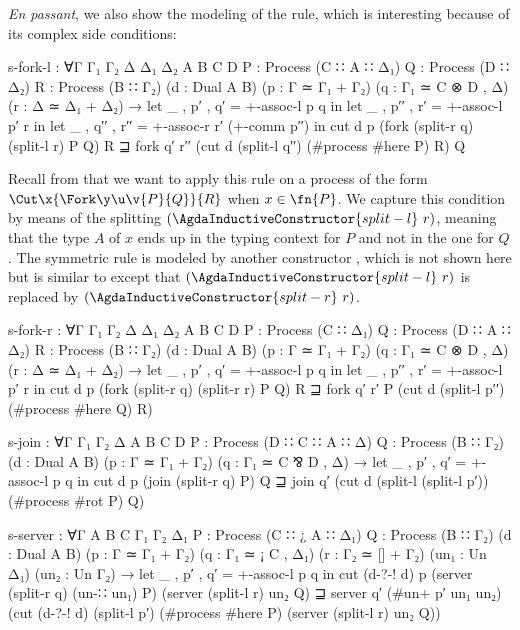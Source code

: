 \begin{AgdaAlign}
\emph{En passant}, we also show the modeling of the \SForkL rule, which is
interesting because of its complex side conditions:

\begin{code}
  s-fork-l :
    ∀{Γ Γ₁ Γ₂ Δ Δ₁ Δ₂ A B C D}
    {P : Process (C ∷ A ∷ Δ₁)} {Q : Process (D ∷ Δ₂)} {R : Process (B ∷ Γ₂)}
    (d : Dual A B) (p : Γ ≃ Γ₁ + Γ₂) (q : Γ₁ ≃ C ⊗ D , Δ) (r : Δ ≃ Δ₁ + Δ₂) →
    let _ , p′ , q′ = +-assoc-l p q in
    let _ , p′′ , r′ = +-assoc-l p′ r in
    let _ , q′′ , r′′ = +-assoc-r r′ (+-comm p′′) in
    cut d p (fork (split-r q) (split-l r) P Q) R ⊒
    fork q′ r′′ (cut d (split-l q′′) (#process #here P) R) Q
\end{code}

Recall from  that we want to apply this rule on a process of
the form $\Cut\x{\Fork\y\u\v{P}{Q}}{R}$ when $x \in \fn{P}$. We capture this
condition by means of the splitting $(\AgdaInductiveConstructor{split-l}~r)$,
meaning that the type $A$ of $x$ ends up in the typing context for $P$ and not
in the one for $Q$.
%
The symmetric rule \SForkR is modeled by another constructor
, which is not shown here but is similar to
 except that
$(\AgdaInductiveConstructor{split-l}~r)$ is replaced by
$(\AgdaInductiveConstructor{split-r}~r)$.

\begin{code}[hide]
  s-fork-r :
    ∀{Γ Γ₁ Γ₂ Δ Δ₁ Δ₂ A B C D}
    {P : Process (C ∷ Δ₁)}
    {Q : Process (D ∷ A ∷ Δ₂)}
    {R : Process (B ∷ Γ₂)}
    (d : Dual A B) (p : Γ ≃ Γ₁ + Γ₂) (q : Γ₁ ≃ C ⊗ D , Δ)
    (r : Δ ≃ Δ₁ + Δ₂) →
    let _ , p′ , q′ = +-assoc-l p q in
    let _ , p′′ , r′ = +-assoc-l p′ r in
    cut d p (fork (split-r q) (split-r r) P Q) R ⊒
    fork q′ r′ P (cut d (split-l p′′) (#process #here Q) R)

  s-join :
    ∀{Γ Γ₁ Γ₂ Δ A B C D}
    {P : Process (D ∷ C ∷ A ∷ Δ)}
    {Q : Process (B ∷ Γ₂)}
    (d : Dual A B) (p : Γ ≃ Γ₁ + Γ₂) (q : Γ₁ ≃ C ⅋ D , Δ) →
    let _ , p′ , q′ = +-assoc-l p q in
    cut d p (join (split-r q) P) Q ⊒
    join q′ (cut d (split-l (split-l p′)) (#process #rot P) Q)

  s-server :
    ∀{Γ A B C Γ₁ Γ₂ Δ₁}
    {P : Process (C ∷ ¿ A ∷ Δ₁)}
    {Q : Process (B ∷ Γ₂)}
    (d : Dual A B) (p : Γ ≃ Γ₁ + Γ₂) (q : Γ₁ ≃ ¡ C , Δ₁) (r : Γ₂ ≃ [] + Γ₂)
    (un₁ : Un Δ₁) (un₂ : Un Γ₂) →
    let _ , p′ , q′ = +-assoc-l p q in
    cut (d-?-! d) p (server (split-r q) (un-∷ un₁) P) (server (split-l r) un₂ Q) ⊒
    server q′ (#un+ p′ un₁ un₂) (cut (d-?-! d) (split-l p′) (#process #here P) (server (split-l r) un₂ Q))


\end{code}
\end{AgdaAlign}
